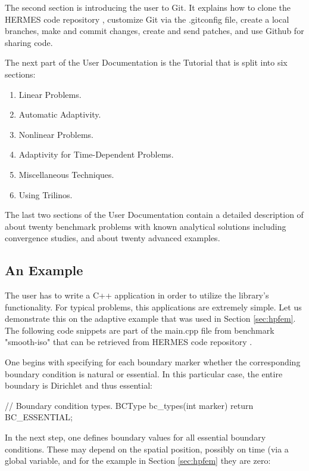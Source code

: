 \documentclass[final,3p,times,twocolumn]{elsarticle}
\begin{document}
The second section is introducing the user to Git. It explains how to 
clone the HERMES code repository \cite{hermes-repo}, customize Git via the .gitconfig file, 
create a local branches, make and commit changes, create and send patches,
and use Github for sharing code. 

The next part of the User Documentation is the Tutorial that is split 
into six sections:

\begin{enumerate}
\item Linear Problems.
\item Automatic Adaptivity.
\item Nonlinear Problems.
\item Adaptivity for Time-Dependent Problems.
\item Miscellaneous Techniques.
\item Using Trilinos.
\end{enumerate}
The last two sections of the User Documentation contain 
a detailed description of about twenty benchmark problems
with known analytical solutions including convergence studies, 
and about twenty advanced examples. 

\subsection{An Example}

The user has to write a C++ application in order to utilize 
the library's functionality. For typical problems, this 
applications are extremely simple. Let us demonstrate this on 
the adaptive example that was used in Section \ref{sec:hpfem}.
The following code snippets are part of the main.cpp file 
from benchmark "smooth-iso" that can be retrieved from HERMES
code repository \cite{hermes-repo}. 

One begins with specifying for each boundary marker whether the 
corresponding boundary condition is natural or essential. In 
this particular case, the entire boundary is Dirichlet and thus 
essential:

\begin{code}
// Boundary condition types.
BCType bc_types(int marker)
{
  return BC_ESSENTIAL;
}
\end{code}
In the next step, one defines boundary values for all 
essential boundary conditions. These may depend on the 
spatial position, possibly on time (via a global variable,
and for the example in Section \ref{sec:hpfem} 
they are zero:
\end{document}
